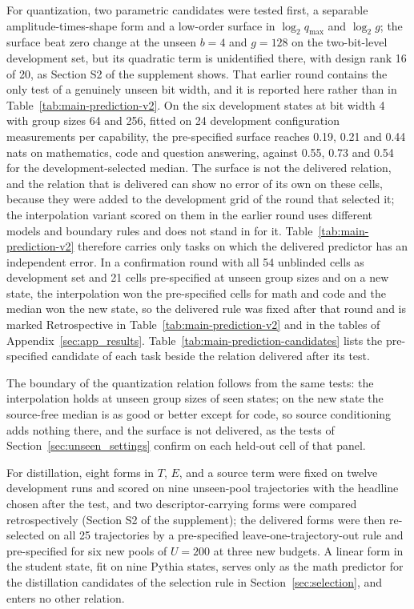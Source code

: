 For quantization, two parametric candidates were tested first, a
separable amplitude-times-shape form and a low-order surface in
$\log_2 q_{\max}$ and $\log_2 g$; the surface beat zero change at the
unseen $b=4$ and $g=128$ on the two-bit-level development set, but its quadratic term is unidentified there, with design rank 16 of 20, as Section S2 of the supplement shows. That earlier round contains the only test of a genuinely unseen bit width, and it is
reported here rather than in Table~\ref{tab:main-prediction-v2}. On the six development states at
bit width 4 with group sizes 64 and 256, fitted on 24 development configuration measurements per
capability, the pre-specified surface reaches 0.19, 0.21 and 0.44 nats on mathematics, code and question
answering, against 0.55, 0.73 and 0.54 for the development-selected median. The surface is not the
delivered relation, and the relation that is delivered can show no error of its own on these cells,
because they were added to the development grid of the round that selected it; the interpolation
variant scored on them in the earlier round uses different models and boundary rules and does not
stand in for it. Table~\ref{tab:main-prediction-v2} therefore carries only tasks on which the
delivered predictor has an independent error. In a confirmation round with all 54
unblinded cells as development set and 21 cells pre-specified at unseen
group sizes and on a new state, the interpolation won the pre-specified cells
for math and code and the median won the new state, so the delivered
rule was fixed after that round and is marked Retrospective in
Table~\ref{tab:main-prediction-v2} and in the tables of
Appendix~\ref{sec:app_results}. Table~\ref{tab:main-prediction-candidates} lists the pre-specified
candidate of each task beside the relation delivered after its test.


The boundary of the quantization relation follows from the same tests: the interpolation holds at unseen group sizes of
seen states; on the new state the source-free median is as good or
better except for code, so source conditioning adds nothing there,
and the surface is not delivered, as the tests of Section~\ref{sec:unseen_settings} confirm on each
held-out cell of that panel.

For distillation, eight forms in $T$, $E$, and a source term were
fixed on twelve development runs and scored on nine unseen-pool
trajectories with the headline chosen after the test, and two
descriptor-carrying forms were compared retrospectively
(Section S2 of the supplement); the delivered forms were then
re-selected on all 25 trajectories by a pre-specified
leave-one-trajectory-out rule and pre-specified for six new pools of
$U{=}200$ at three new budgets. A linear form in the student state, fit on nine Pythia states, serves only as the math predictor for the distillation candidates of the selection rule in
Section~\ref{sec:selection}, and enters no other relation.

